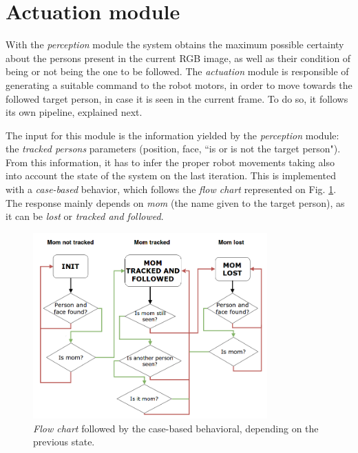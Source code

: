 \section{Actuation module}

With the \emph{perception} module the system obtains the maximum possible certainty about the persons present in the current RGB image, as well as their condition of being or not being the one to be followed. The \emph{actuation} module is responsible of generating a suitable command to the robot motors, in order to move towards the followed target person, in case it is seen in the current frame. To do so, it follows its own pipeline, explained next.

The input for this module is the information yielded by the \emph{perception} module: the \emph{tracked persons} parameters (position, face, ``is or is not the target person"). From this information, it has to infer the proper robot movements taking also into account the state of the system on the last iteration. This is implemented with a \emph{case-based} behavior, which follows the \emph{flow chart} represented on Fig. \ref{fig:actuation_flow}. The response mainly depends on \emph{mom} (the name given to the target person), as it can be \emph{lost} or \emph{tracked and followed}.\\

\begin{figure}[h]
	\centering
	\includegraphics[width=9cm]{images/flowchart}
	\caption{\emph{Flow chart} followed by the case-based behavioral, depending on the previous state.}
	\label{fig:actuation_flow}
\end{figure}

